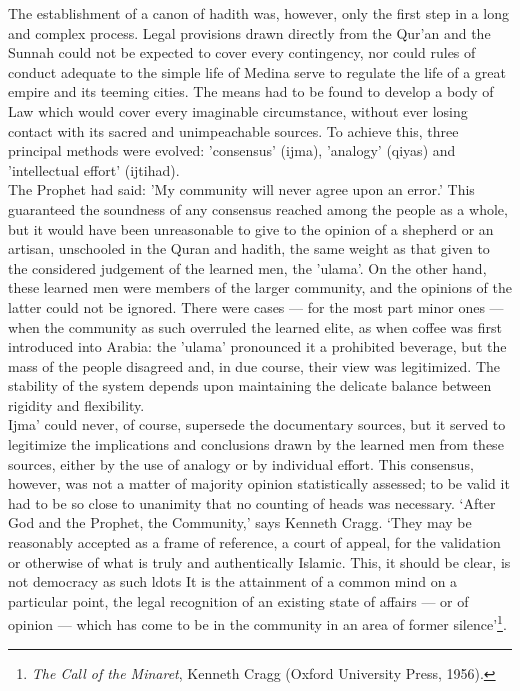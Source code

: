 \documentclass[10pt, twoside,openright]{book}
\begin{document}
The establishment of a canon of hadith was, however, only the first step in a long and complex 
process. Legal provisions drawn directly from the Qur'an and the Sunnah could not be expected to 
cover every contingency, nor could rules of conduct adequate to the simple life of Medina serve to 
regulate the life of a great empire and its teeming cities. The means had to be found to develop a 
body of Law which would cover every imaginable circumstance, without ever losing contact with its 
sacred and unimpeachable sources. To achieve this, three principal methods were evolved: 'consensus' 
(ijma), 'analogy' (qiyas) and 'intellectual effort' (ijtihad). \\

The Prophet had said: 'My community will never agree upon an error.' This guaranteed the soundness of 
any consensus reached among the people as a whole, but it would have been unreasonable to give to the 
opinion of a shepherd or an artisan, unschooled in the Quran and hadith, the same weight as that 
given to the considered judgement of the learned men, the 'ulama'. On the other hand, these learned 
men were members of the larger community, and the opinions of the latter could not be ignored. There 
were cases --- for the most part minor ones --- when the community as such overruled the learned elite, 
as when coffee was first introduced into Arabia: the 'ulama' pronounced it a prohibited beverage, but 
the mass of the people disagreed and, in due course, their view was legitimized. The stability of the 
system depends upon maintaining the delicate balance between rigidity and flexibility. \\

Ijma' could never, of course, supersede the documentary sources, but it served to legitimize the 
implications and conclusions drawn by the learned men from these sources, either by the use of 
analogy or by individual effort. This consensus, however, was not a matter of majority opinion 
statistically assessed; to be valid it had to be so close to unanimity that no counting of heads was 
necessary. `After God and the Prophet, the Community,' says Kenneth Cragg. `They may be reasonably 
accepted as a frame of reference, a court of appeal, for the validation or otherwise of what is truly 
and authentically Islamic. This, it should be clear, is not democracy as such ldots{} It is the 
attainment of a common mind on a particular point, the legal recognition of an existing state of 
affairs --- or of opinion --- which has come to be in the community in an area of former silence'\footnote{\emph{The Call of the Minaret}, Kenneth Cragg (Oxford University Press, 1956).}. \\
\end{document}
